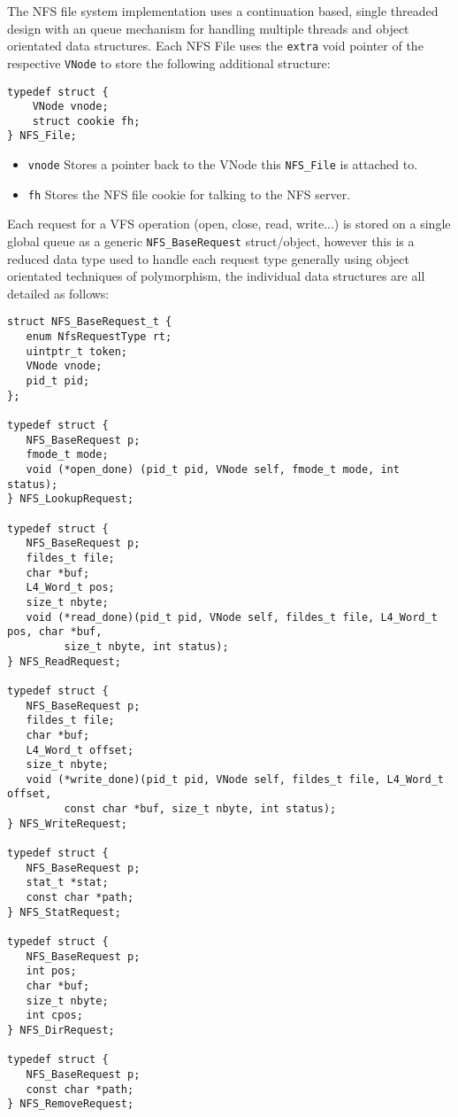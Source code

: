 \documentclass[12pt,english]{article}
\begin{document}
The NFS file system implementation uses a continuation based, single threaded design with an queue mechanism for handling multiple threads and object orientated data structures. Each NFS File uses the \texttt{extra} void pointer of the respective \texttt{VNode} to store the following additional structure:

\begin{verbatim}
typedef struct {
    VNode vnode;
    struct cookie fh;
} NFS_File;
\end{verbatim}

\begin{itemize}
\item \texttt{vnode} Stores a pointer back to the VNode this \texttt{NFS\_File} is attached to.
\item \texttt{fh} Stores the NFS file cookie for talking to the NFS server.
\end{itemize}

Each request for a VFS operation (open, close, read, write...) is stored on a single global queue as a generic \texttt{NFS\_BaseRequest} struct/object, however this is a reduced data type used to handle each request type generally using object orientated techniques of polymorphism, the individual data structures are all detailed as follows:

\begin{verbatim}
struct NFS_BaseRequest_t {
   enum NfsRequestType rt;
   uintptr_t token;
   VNode vnode;
   pid_t pid;
};

typedef struct {
   NFS_BaseRequest p;
   fmode_t mode;
   void (*open_done) (pid_t pid, VNode self, fmode_t mode, int status);
} NFS_LookupRequest;

typedef struct {
   NFS_BaseRequest p;
   fildes_t file;
   char *buf;
   L4_Word_t pos;
   size_t nbyte;
   void (*read_done)(pid_t pid, VNode self, fildes_t file, L4_Word_t pos, char *buf,
         size_t nbyte, int status);
} NFS_ReadRequest;

typedef struct {
   NFS_BaseRequest p;
   fildes_t file;
   char *buf;
   L4_Word_t offset;
   size_t nbyte;
   void (*write_done)(pid_t pid, VNode self, fildes_t file, L4_Word_t offset,
         const char *buf, size_t nbyte, int status);
} NFS_WriteRequest;

typedef struct {
   NFS_BaseRequest p;
   stat_t *stat;
   const char *path;
} NFS_StatRequest;

typedef struct {
   NFS_BaseRequest p;
   int pos;
   char *buf;
   size_t nbyte;
   int cpos;
} NFS_DirRequest;

typedef struct {
   NFS_BaseRequest p;
   const char *path;
} NFS_RemoveRequest;
\end{verbatim}
\end{document}
